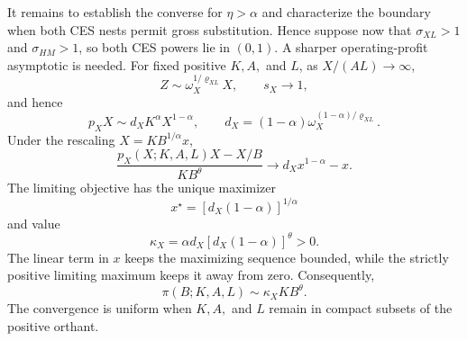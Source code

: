 It remains to establish the converse for \(\eta>\alpha\) and characterize the
boundary when both CES nests permit gross substitution. Hence suppose now that
\(\sigma_{XL}>1\) and \(\sigma_{HM}>1\), so both CES powers lie in \((0,1)\).
A sharper operating-profit asymptotic is needed. For fixed positive
\(K,A,\) and \(L\), as \(X/(AL)\to\infty\),
\[
 Z\sim\omega_X^{1/\varrho_{XL}}X,
 \qquad s_X\to1,
\]
and hence
\[
 p_XX\sim d_XK^\alpha X^{1-\alpha},
 \qquad
 d_X=(1-\alpha)\omega_X^{(1-\alpha)/\varrho_{XL}}.
\]
Under the rescaling \(X=KB^{1/\alpha}x\),
\[
 \frac{p_X(X;K,A,L)X-X/B}{KB^\theta}
 \longrightarrow d_Xx^{1-\alpha}-x.
\]
The limiting objective has the unique maximizer
\[
 x^\star=[d_X(1-\alpha)]^{1/\alpha}
\]
and value
\[
 \kappa_X=\alpha d_X[d_X(1-\alpha)]^\theta>0.
\]
The linear term in \(x\) keeps the maximizing sequence bounded, while the
strictly positive limiting maximum keeps it away from zero. Consequently,
\[
 \pi(B;K,A,L)\sim\kappa_XKB^\theta.
\]
The convergence is uniform when \(K,A,\) and \(L\) remain in compact subsets of
the positive orthant.

